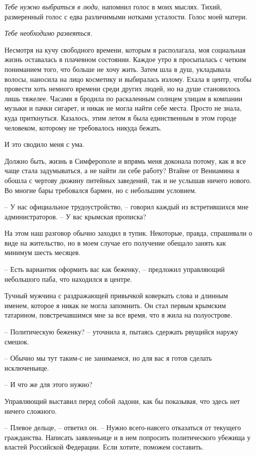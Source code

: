 \documentclass[
]{book}
\begin{document}
\emph{Тебе нужно выбраться в люди}, напомнил голос в моих мыслях. Тихий, размеренный голос с едва различимыми нотками усталости. Голос моей матери.

\emph{Тебе необходимо развеяться.}

Несмотря на кучу свободного времени, которым я располагала, моя социальная жизнь оставалась в плачевном состоянии. Каждое утро я просыпалась с четким пониманием того, что больше не хочу жить. Затем шла в душ, укладывала волосы, наносила на лицо косметику и выбиралась излому. Ехала в центр, чтобы провести хоть немного времени среди других людей, но на душе становилось лишь тяжелее. Часами я бродила по раскаленным солнцем улицам в компании музыки и пачки сигарет, и никак не могла найти себе места. Просто не знала, куда приткнуться. Казалось, этим летом я была единственным в этом городе человеком, которому не требовалось никуда бежать.

И это сводило меня с ума.

Должно быть, жизнь в Симферополе и впрямь меня доконала потому, как я все чаще стала задумываться, а не найти ли себе работу? Втайне от Вениамина я обошла с чертову дюжину питейных заведений, так и не услышав ничего нового. Во многие бары требовался бармен, но с небольшим условием.

-- У нас официальное трудоустройство, -- говорил каждый из встретившихся мне администраторов. -- У вас крымская прописка?

На этом наш разговор обычно заходил в тупик. Некоторые, правда, спрашивали о виде на жительство, но в моем случае его получение обещало занять как минимум шесть месяцев.

-- Есть вариантик оформить вас как беженку, -- предложил управляющий небольшого паба, что находился в центре.

Тучный мужчина с раздражающей привычкой коверкать слова и длинным именем, которое я никак не могла запомнить. Он стал первым крымским татарином, повстречавшимся мне за все время, что я жила на полуострове.

-- Политическую беженку? -- уточнила я, пытаясь сдержать рвущийся наружу смешок.

-- Обычно мы тут таким-с не занимаемся, но для вас я готов сделать исключеньице.

-- И что же для этого нужно?

Управляющий выставил перед собой ладони, как бы показывая, что здесь нет ничего сложного.

-- Плевое дельце, -- ответил он. -- Нужно всего-навсего отказаться от текущего гражданства. Написать заявленьице и в нем попросить политического убежища у властей Российской Федерации. Если хотите, поможем составить.
\end{document}
